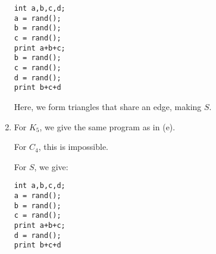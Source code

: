 \begin{enumerate}[label=(\alph*)]
\begin{verbatim}
int a,b,c,d;
a = rand();
b = rand();
c = rand();
print a+b+c;
b = rand();
c = rand();
d = rand();
print b+c+d
\end{verbatim}

Here, we form triangles that share an edge, making $S$.

\item

  For $K_5$, we give the same program as in (e).

  For $C_4$, this is impossible.

  For $S$, we give:

\begin{verbatim}
int a,b,c,d;
a = rand();
b = rand();
c = rand();
print a+b+c;
d = rand();
print b+c+d
\end{verbatim}






        
\end{enumerate}

